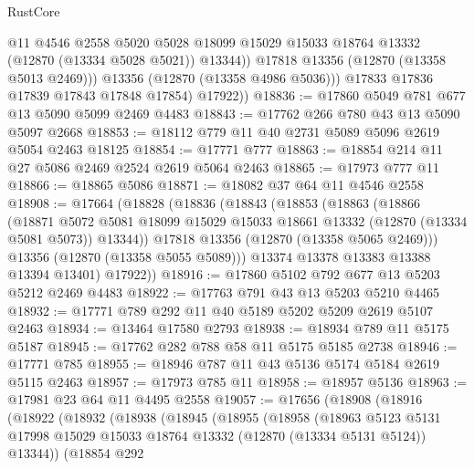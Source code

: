 \begin{lexlean}{RustCore}
\begin{coremodule}
                  @11
                  @4546
                  @2558
                  @5020
                  @5028
                  @18099
                  @15029
                  @15033
                  @18764
                  @13332
                  (@12870 (@13334 @5028 @5021))
                  @13344))
              @17818
              @13356
              (@12870 (@13358 @5013 @2469)))
            @13356
            (@12870 (@13358 @4986 @5036)))
          @17833
          @17836
          @17839
          @17843
          @17848
          @17854)
        @17922))
@18836 := @17860 @5049 @781 @677 @13 @5090 @5099 @2469 @4483
@18843 := @17762 @266 @780 @43 @13 @5090 @5097 @2668
@18853 := @18112 @779 @11 @40 @2731 @5089 @5096 @2619 @5054 @2463 @18125
@18854 := @17771 @777
@18863 := @18854 @214 @11 @27 @5086 @2469 @2524 @2619 @5064 @2463
@18865 := @17973 @777 @11
@18866 := @18865 @5086
@18871 := @18082 @37 @64 @11 @4546 @2558
@18908 := @17664
    (@18828
      (@18836
        (@18843
          (@18853
            (@18863
              (@18866
                (@18871
                  @5072
                  @5081
                  @18099
                  @15029
                  @15033
                  @18661
                  @13332
                  (@12870 (@13334 @5081 @5073))
                  @13344))
              @17818
              @13356
              (@12870 (@13358 @5065 @2469)))
            @13356
            (@12870 (@13358 @5055 @5089)))
          @13374
          @13378
          @13383
          @13388
          @13394
          @13401)
        @17922))
@18916 := @17860 @5102 @792 @677 @13 @5203 @5212 @2469 @4483
@18922 := @17763 @791 @43 @13 @5203 @5210 @4465
@18932 := @17771 @789 @292 @11 @40 @5189 @5202 @5209 @2619 @5107 @2463
@18934 := @13464 @17580 @2793
@18938 := @18934 @789 @11 @5175 @5187
@18945 := @17762 @282 @788 @58 @11 @5175 @5185 @2738
@18946 := @17771 @785
@18955 := @18946 @787 @11 @43 @5136 @5174 @5184 @2619 @5115 @2463
@18957 := @17973 @785 @11
@18958 := @18957 @5136
@18963 := @17981 @23 @64 @11 @4495 @2558
@19057 := @17656
    (@18908
      (@18916
        (@18922
          (@18932
            (@18938
              (@18945
                (@18955
                  (@18958
                    (@18963
                      @5123
                      @5131
                      @17998
                      @15029
                      @15033
                      @18764
                      @13332
                      (@12870 (@13334 @5131 @5124))
                      @13344))
                  (@18854
                    @292

\end{coremodule}
\end{lexlean}

